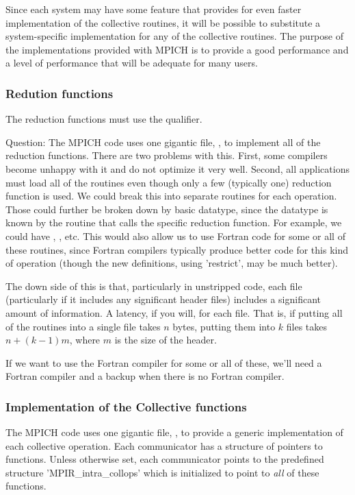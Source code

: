 \documentclass{article}
\begin{document}
Since each system may have some feature that provides for even faster
implementation of the collective routines, it will be possible to
substitute a system-specific implementation for any of the collective
routines.  The purpose of the implementations provided with MPICH is
to provide a good performance and a level of performance that will be adequate
for many users.  

\subsubsection{Redution functions}
The reduction functions must use the  qualifier.

Question:
The MPICH code uses one gigantic file, , to implement
all of the reduction functions.  There are two problems with this.
First, some compilers become unhappy with it and do not optimize it
very well.  Second, all applications must load all of the routines
even though only a few (typically one) reduction function is used.  We
could break this into separate routines for each operation.  Those
could further be broken down by basic datatype, since the datatype is
known by the routine that calls the specific reduction function.  
For example, we could have ,
, etc.  This would also allow us to use Fortran
code for some or all of these routines, since Fortran compilers
typically produce better code for this kind of operation (though the
new definitions, using 'restrict', may be much better).

The down side of this is that, particularly in unstripped code, each
file (particularly if it includes any significant header files)
includes a significant amount of information.  A latency, if you will,
for each file.  That is, if putting all of the routines into a single
file takes $n$ bytes, putting them into $k$ files takes $n + (k-1)m$,
where $m$ is the size of the header.  

If we want to use the Fortran compiler for some or all of these, we'll
need a Fortran compiler and a backup when there is no Fortran compiler.

\subsubsection{Implementation of the Collective functions}

The MPICH code uses one gigantic file, , to provide a
generic implementation of each collective operation.  Each
communicator has a structure of pointers to functions.  Unless
otherwise set, each communicator points to the predefined structure
'MPIR_intra_collops' which is initialized to point to \emph{all} of
these functions.  
\end{document}
